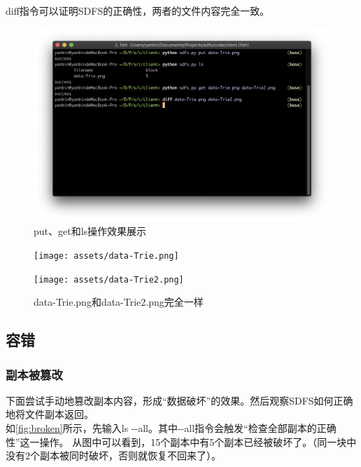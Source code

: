 \documentclass[a4paper]{article}
\begin{document}
diff指令可以证明SDFS的正确性，两者的文件内容完全一致。
\begin{figure}[!hbt]
    \begin{center}
    \includegraphics[scale=0.6]{assets/put-get.png}
    \caption{put、get和ls操作效果展示\label{fig:put-get}} 
    \end{center} 
\end{figure} 

\begin{figure}[!hbt]
\begin{minipage}{0.28\textwidth}
    \centering
    \texttt{[image: assets/data-Trie.png]}
\end{minipage}\hfill
\begin{minipage}{0.28\textwidth}
    \centering
    \texttt{[image: assets/data-Trie2.png]}
\end{minipage}
\caption{data-Trie.png和data-Trie2.png完全一样} \label{fig:diff}
\end{figure}

\subsection{容错}
\subsubsection{副本被篡改}
下面尝试手动地篡改副本内容，形成``数据破坏''的效果。然后观察SDFS如何正确地将文件副本返回。\\

如\autoref{fig:broken}所示，先输入ls -{}-all。其中-{}-all指令会触发``检查全部副本的正确性''这一操作。
从图中可以看到，15个副本中有5个副本已经被破坏了。（同一块中没有2个副本被同时破坏，否则就恢复不回来了）。\\
\end{document}
